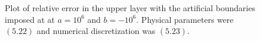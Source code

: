 \begin{figure}[H]
\vspace{3mm}
\caption{Plot of relative error in the upper layer with the artificial boundaries imposed at at $a=10^{6}$ and $b=-10^{6}$. Physical parameters were $(5.22)$ and numerical discretization was $(5.23)$.}
\label{Fig:Eps}
\end{figure}

